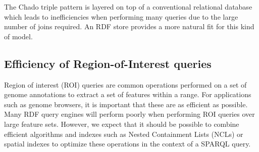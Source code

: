 The Chado triple pattern is layered on top of a conventional
relational database which leads to inefficiencies when performing many
queries due to the large number of joins required. An RDF store
provides a more natural fit for this kind of model.

\subsection*{Efficiency of Region-of-Interest queries}

Region of interest (ROI) queries are common operations performed on a
set of genome annotations to extract a set of features within a
range. For applications such as genome browsers, it is important that
these are as efficient as possible. Many RDF query engines will
perform poorly when performing ROI queries over large feature
sets. However, we expect that it should be possible to combine
efficient algorithms and indexes such as Nested Containment Lists
(NCLs)\cite{NCL2007} or spatial indexes to optimize these operations
in the context of a SPARQL query.



